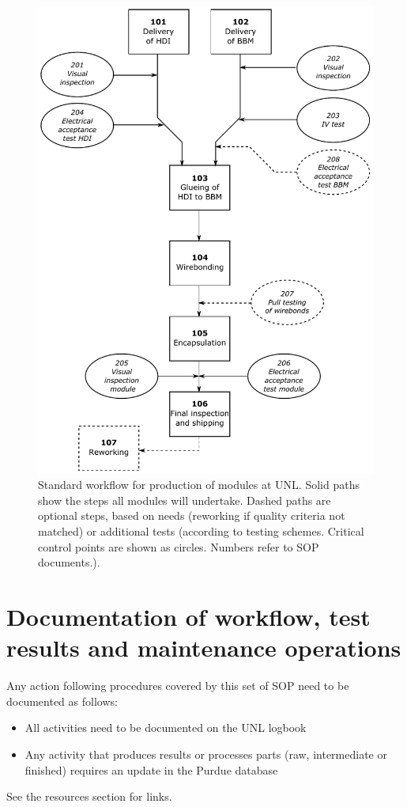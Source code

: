 \documentclass[12pt]{unlsilabsop}
\begin{document}
\begin{figure}[h]
    \begin{center}
        \includegraphics[width=12.7cm]{img/WorkflowProduction.pdf}
        \caption{Standard workflow for production of modules at UNL. Solid paths show the steps all modules will undertake. Dashed paths are optional steps, based on needs (reworking if quality criteria not matched) or additional tests (according to testing schemes. Critical control points are shown as circles. Numbers refer to SOP documents.).}
        \label{fig:WorkflowProduction}
    \end{center}
\end{figure}

\section{Documentation of workflow, test results and maintenance operations}
Any action following procedures covered by this set of SOP need to be documented as follows:
\begin{itemize}
\item All activities need to be documented on the UNL logbook
\item Any activity that produces results or processes parts (raw, intermediate or finished) requires an update in the Purdue database
\end{itemize}
See the resources section for links.
\end{document}
